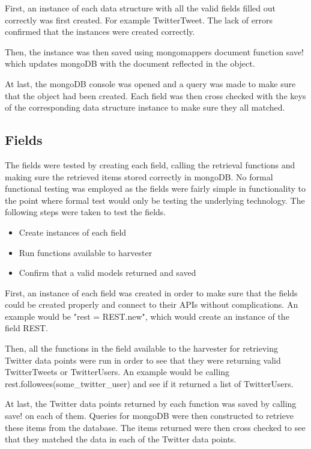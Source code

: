 First, an instance of each data structure with all the valid fields filled out correctly was first created. For example TwitterTweet. The lack of errors confirmed that the instances were created correctly.

Then, the instance was then saved using mongomappers document function save! which updates mongoDB with the document reflected in the object.

At last, the mongoDB console was opened and a query was made to make sure that the object had been created. Each field was then cross checked with the keys of the corresponding data structure instance to make sure they all matched.

\subsection{Fields}
The fields were tested by creating each field, calling the retrieval functions and making sure the retrieved items stored correctly in mongoDB. No formal functional testing was employed as the fields were fairly simple in functionality to the point where formal test would only be testing the underlying technology. The following steps were taken to test the fields.

	\begin{itemize}
	\item Create instances of each field
	\item Run functions available to harvester
	\item Confirm that a valid models returned and saved
	\end{itemize}

First, an instance of each field was created in order to make sure that the fields could be created properly and connect to their APIs without complications. An example would be "rest = REST.new", which would create an instance of the field REST.

Then, all the functions in the field available to the harvester for retrieving Twitter data points were run in order to see that they were returning valid TwitterTweets or TwitterUsers. An example would be calling rest.followees(some\_twitter\_user) and see if it returned a list of TwitterUsers.

At last, the Twitter data points returned by each function was saved by calling save! on each of them. Queries for mongoDB were then constructed to retrieve these items from the database. The items returned were then cross checked to see that they matched the data in each of the Twitter data points.

